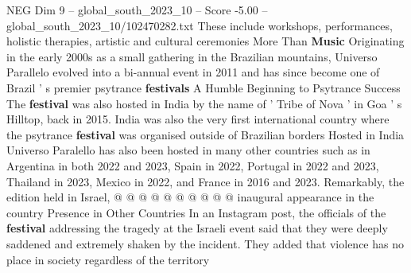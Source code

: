\begin{textsample}{NEG Dim 9 – global\_south\_2023\_10 – Score -5.00 – global\_south\_2023\_10/102470282.txt}
These include workshops, performances, holistic therapies, artistic and cultural ceremonies More Than \textbf{Music} Originating in the early 2000s as a small gathering in the Brazilian mountains, Universo Parallelo evolved into a bi-annual event in 2011 and has since become one of Brazil ' s premier psytrance \textbf{festivals} A Humble Beginning to Psytrance Success The \textbf{festival} was also hosted in India by the name of ' Tribe of Nova ' in Goa ' s Hilltop, back in 2015.
India was also the very first international country where the psytrance \textbf{festival} was organised outside of Brazilian borders Hosted in India Universo Paralello has also been hosted in many other countries such as in Argentina in both 2022 and 2023, Spain in 2022, Portugal in 2022 and 2023, Thailand in 2023, Mexico in 2022, and France in 2016 and 2023.
Remarkably, the edition held in Israel, @ @ @ @ @ @ @ @ @ @ inaugural appearance in the country Presence in Other Countries In an Instagram post, the officials of the \textbf{festival} addressing the tragedy at the Israeli event said that they were deeply saddened and extremely shaken by the incident.
They added that violence has no place in society regardless of the territory

\end{textsample}
